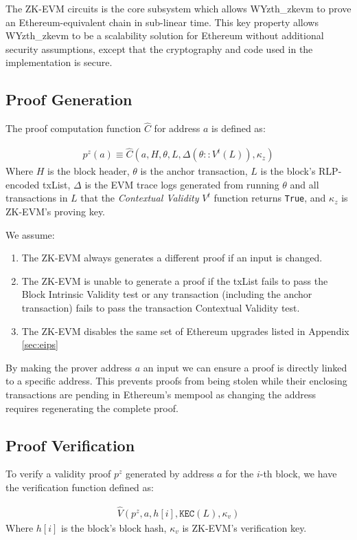 \documentclass[9pt,oneside]{amsart}
\begin{document}
\begin{multicols}{2}
The ZK-EVM circuits is the core subsystem which allows WYzth_zkevm to prove an Ethereum-equivalent chain in sub-linear time. This key property allows WYzth_zkevm to be a scalability solution for Ethereum without additional security assumptions, except that the cryptography and code used in the implementation is secure.

\subsection{Proof Generation} The proof computation function $\hat{C}$ for address $a$ is defined as:

\begin{eqnarray}
    p^z(a) \equiv \hat{C}(a, H,\theta, L, \Delta(\theta::V^t(L)),\kappa_z )
\end{eqnarray}
Where $H$ is the block header, $\theta$ is the anchor transaction, $L$ is the block's RLP-encoded txList, $\Delta$ is the EVM trace logs generated from running $\theta$ and all transactions in $L$ that the \textit{Contextual Validity} $V^t$ function returns \texttt{True}, and $\kappa_z$ is  ZK-EVM's proving key.

We assume:
\begin{enumerate}
\item The ZK-EVM always generates a different proof if an input is changed.
\item The ZK-EVM is unable to generate a proof if the txList fails to pass the Block Intrinsic Validity test or any transaction (including the anchor transaction) fails to pass the transaction Contextual Validity test.
\item The ZK-EVM disables the same set of Ethereum upgrades listed in Appendix \ref{sec:eips}
\end{enumerate}

By making the prover address $a$ an input we can ensure a proof is directly linked to a specific address. This prevents proofs from being stolen while their enclosing transactions are pending in Ethereum's mempool as changing the address requires regenerating the complete proof.

\subsection{Proof Verification} To verify a validity proof $p^z$ generated by address $a$ for the $i$-th block, we have the verification function defined as:

\begin{eqnarray}
    \hat{V}(p^z, a, h[i], \texttt{KEC}(L), \kappa_v)
\end{eqnarray}
Where $h[i]$ is the block's block hash, $\kappa_v$ is ZK-EVM's verification key.


\end{multicols}
\end{document}
